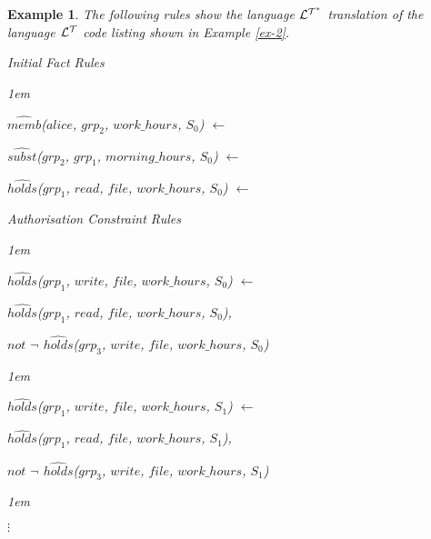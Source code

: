 \documentclass[11pt]{report}
\newtheorem{vexample}{Example}[chapter]
\newenvironment{vquote}
{
  \begin{list}{}{\leftmargin 1em}\item[]
}
{
  \end{list}
}
\begin{document}
        \begin{vexample}
          \label{ex-3}
          The following rules show the language ${\cal L^{T^*}}$ translation
          of the language ${\cal L^T}$ code listing shown in Example
          \ref{ex-2}.

          \begin{enumerate}
            \item
              Initial Fact Rules

              \begin{vquote}
  $\hat{memb}$($alice$, $grp_2$, $work\_hours$, $S_0$) $\leftarrow$

  $\hat{subst}$($grp_2$, $grp_1$, $morning\_hours$, $S_0$) $\leftarrow$

  $\hat{holds}$($grp_1$, $read$, $file$, $work\_hours$, $S_0$) $\leftarrow$
              \end{vquote}

            \item
              Authorisation Constraint Rules

              \begin{vquote}
                $\hat{holds}$($grp_1$, $write$, $file$, $work\_hours$, $S_0$) $\leftarrow$

                \hspace{1em}
                $\hat{holds}$($grp_1$, $read$, $file$, $work\_hours$, $S_0$),

                \hspace{1em}
                $not$ $\lnot$ $\hat{holds}$($grp_3$, $write$, $file$, $work\_hours$, $S_0$)
              \end{vquote}

              \begin{vquote}
                $\hat{holds}$($grp_1$, $write$, $file$, $work\_hours$, $S_1$) $\leftarrow$

                \hspace{1em}
                $\hat{holds}$($grp_1$, $read$, $file$, $work\_hours$, $S_1$),

                \hspace{1em}
                $not$ $\lnot$ $\hat{holds}$($grp_3$, $write$, $file$, $work\_hours$, $S_1$)
              \end{vquote}

              \begin{vquote}
                \hspace{1em}
                $\vdots$
              \end{vquote}


\end{enumerate}
\end{vexample}
\end{document}
